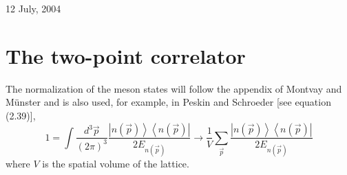 \documentclass[12pt]{article}
\begin{document}
\begin{center}
\vspace{2mm}

12 July, 2004
\end{center}

\section{The two-point correlator}

The normalization of the meson states will follow the appendix of
Montvay and M\"unster and is also used, for example, in Peskin and
Schroeder [see equation (2.39)],
\[
1 = \int\frac{d^3\vec{p}}{(2\pi)^3}\frac{\left|n(\vec{p})\right>
    \left<n(\vec{p})\right|}{2E_{n(\vec p)}}
\to \frac{1}{V}\sum_{\vec p}\frac{\left|n(\vec{p})\right>
    \left<n(\vec{p})\right|}{2E_{n(\vec p)}}
\]
where $V$ is the spatial volume of the lattice.
\end{document}
